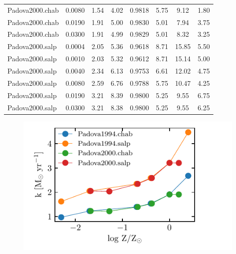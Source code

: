 \documentclass[12pt,letterpaper,usenatbib,useAMS]{article}
\def\Ha{\ifmmode \mathrm{H}\alpha \else H$\alpha$\xspace \fi}
\begin{document}
\begin{table}
{\begin{threeparttable}
\begin{tabular}{l|c|c|c|c|c|c|c}
            Padova2000.chab & 0.0080 & 1.54 & 4.02 & 0.9818 & 5.75 & 9.12 & 1.80 \\
            Padova2000.chab & 0.0190 & 1.91 & 5.00 & 0.9830 & 5.01 & 7.94 & 3.75 \\
            Padova2000.chab & 0.0300 & 1.91 & 4.99 & 0.9829 & 5.01 & 8.32 & 3.25 \\
            Padova2000.salp & 0.0004 & 2.05 & 5.36 & 0.9618 & 8.71 & 15.85 & 5.50 \\
            Padova2000.salp & 0.0010 & 2.03 & 5.32 & 0.9612 & 8.71 & 15.14 & 5.00 \\
            Padova2000.salp & 0.0040 & 2.34 & 6.13 & 0.9753 & 6.61 & 12.02 & 4.75 \\
            Padova2000.salp & 0.0080 & 2.59 & 6.76 & 0.9788 & 5.75 & 10.47 & 4.25 \\
            Padova2000.salp & 0.0190 & 3.21 & 8.39 & 0.9800 & 5.25 & 9.55 & 6.75 \\
            Padova2000.salp & 0.0300 & 3.21 & 8.38 & 0.9800 & 5.25 & 9.55 & 6.25 \\
            \hline   
        \end{tabular}
    \end{threeparttable}
    }
    \label{tab:k}
\end{table}

\begin{figure}
    \includegraphics[width=\textwidth]{logZ_k_bases.pdf}
    \caption{}
    \label{fig:k}
\end{figure}






\end{document}
